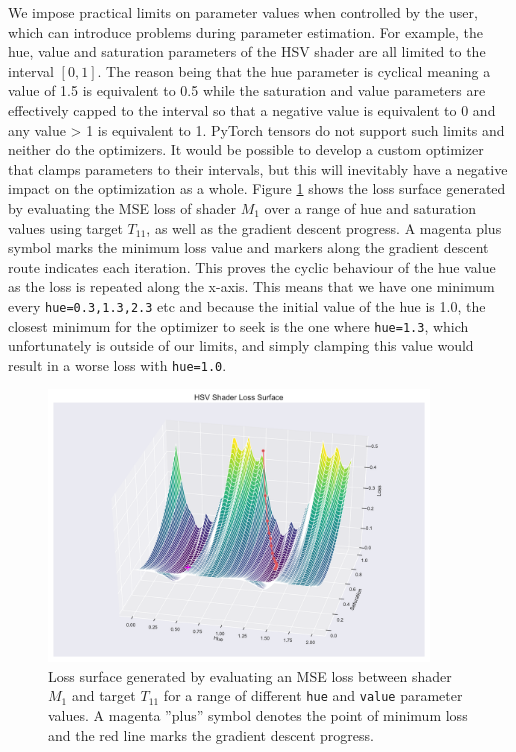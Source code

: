 We impose practical limits on parameter values when controlled by the user, which can introduce problems during parameter estimation. For example, the hue, value and saturation parameters of the HSV shader are all limited to the interval $[0,1]$. The reason being that the hue parameter is cyclical meaning a value of 1.5 is equivalent to 0.5 while the saturation and value parameters are effectively capped to the interval so that a negative value is equivalent to 0 and any value > 1 is equivalent to 1. PyTorch tensors do not support such limits and neither do the optimizers. It would be possible to develop a custom optimizer that clamps parameters to their intervals, but this will inevitably have a negative impact on the optimization as a whole. Figure \ref{fig:HSVShaderLossSurface} shows the loss surface generated by evaluating the MSE loss of shader $M_1$ over a range of hue and saturation values using target $T_{11}$, as well as the gradient descent progress. A magenta plus symbol marks the minimum loss value and markers along the gradient descent route indicates each iteration. This proves the cyclic behaviour of the hue value as the loss is repeated along the x-axis. This means that we have one minimum every \texttt{hue=0.3,1.3,2.3} etc and because the initial value of the hue is 1.0, the closest minimum for the optimizer to seek is the one where \texttt{hue=1.3}, which unfortunately is outside of our limits, and simply clamping this value would result in a worse loss with \texttt{hue=1.0}.

\begin{figure}[h]
    \centering
    \includegraphics[width=0.9\textwidth]{img/evaluation/HSV Shader Loss Surface.pdf}
    \caption{Loss surface generated by evaluating an MSE loss between shader $M_1$ and target $T_{11}$ for a range of different \texttt{hue} and \texttt{value} parameter values. A magenta ''plus'' symbol denotes the point of minimum loss and the red line marks the gradient descent progress.}
    \label{fig:HSVShaderLossSurface}
\end{figure}
